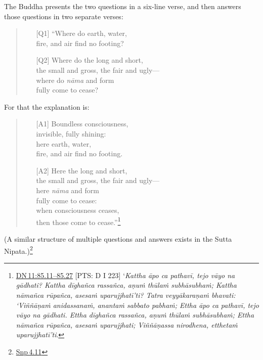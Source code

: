 \documentclass[10pt, openright]{book}
\begin{document}
The Buddha presents the two questions in a six-line verse, and then answers those questions in two separate verses:


\begin{quote}


\begin{itemize}

\item[{[Q1]}]“Where do earth, water, \\ fire, and air find no footing?


\item[{[Q2]}]Where do the long and short, \\ the small and gross, the fair and ugly— \\ where do \textit{nāma} and form \\ fully come to cease?

\end{itemize}

\end{quote}
For that the explanation is:


\begin{quote}


\begin{itemize}

\item[{[A1]}]Boundless consciousness, \\ invisible, fully shining: \\ here earth, water, \\ fire, and air find no footing.


\item[{[A2]}]Here the long and short, \\ the small and gross, the fair and ugly— \\ here \textit{nāma} and form \\ fully come to cease: \\ when consciousness ceases, \\ then those come to cease.”\footnote {\href{https://suttacentral.net/dn11/en/sujato\#85.11}{DN 11:85.11–85.27} [PTS: D I 223] ‘\textit{Kattha āpo ca pathavī, tejo vāyo na gādhati? Kattha dīghañca rassañca, aṇuṁ thūlaṁ subhāsubhaṁ; Kattha nāmañca rūpañca, asesaṁ uparujjhatī’ti? Tatra veyyākaraṇaṁ bhavati: ‘Viññāṇaṁ anidassanaṁ, anantaṁ sabbato pabhaṁ; Ettha āpo ca pathavī, tejo vāyo na gādhati. Ettha dīghañca rassañca, aṇuṁ thūlaṁ subhāsubhaṁ; Ettha nāmañca rūpañca, asesaṁ uparujjhati; Viññāṇassa nirodhena, etthetaṁ uparujjhatī’ti}.}

\end{itemize}

\end{quote}
(A similar structure of multiple questions and answers exists in the Sutta Nipata.)\footnote {\href{https://suttacentral.net/snp4.11/en/sujato}{Snp 4.11}}
\end{document}
